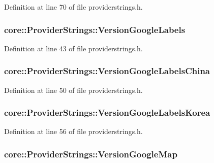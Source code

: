 \-Definition at line 70 of file providerstrings.\-h.

\hypertarget{group___o_p_map_widget_gaa55f03ddecd8e241164698587988c456}{
\subsubsection[{\-Version\-Google\-Labels}]{ {\bf core\-::\-Provider\-Strings\-::\-Version\-Google\-Labels}}}\label{group___o_p_map_widget_gaa55f03ddecd8e241164698587988c456}


\-Definition at line 43 of file providerstrings.\-h.

\hypertarget{group___o_p_map_widget_ga702737218086c22a41d6dfaeb6092644}{
\subsubsection[{\-Version\-Google\-Labels\-China}]{ {\bf core\-::\-Provider\-Strings\-::\-Version\-Google\-Labels\-China}}}\label{group___o_p_map_widget_ga702737218086c22a41d6dfaeb6092644}


\-Definition at line 50 of file providerstrings.\-h.

\hypertarget{group___o_p_map_widget_ga4f4a5781537c7ee429695a130c8ccbdb}{
\subsubsection[{\-Version\-Google\-Labels\-Korea}]{ {\bf core\-::\-Provider\-Strings\-::\-Version\-Google\-Labels\-Korea}}}\label{group___o_p_map_widget_ga4f4a5781537c7ee429695a130c8ccbdb}


\-Definition at line 56 of file providerstrings.\-h.

\hypertarget{group___o_p_map_widget_ga8c6875ce694aabbd5987f55b816cca2b}{
\subsubsection[{\-Version\-Google\-Map}]{ {\bf core\-::\-Provider\-Strings\-::\-Version\-Google\-Map}}}\label{group___o_p_map_widget_ga8c6875ce694aabbd5987f55b816cca2b}



